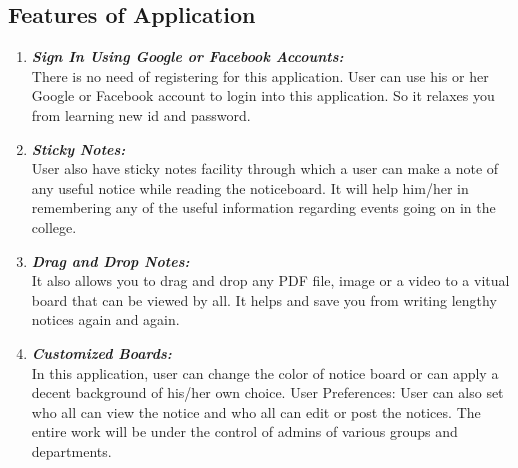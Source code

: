 \subsection{Features of Application}
\begin{enumerate}
\item \textbf{\emph{Sign In Using Google or Facebook Accounts:}}\\
 There is no need of registering for this
application. User can use his or her Google or Facebook account to login into this application. So
it relaxes you from learning new id and password.
\item \textbf{\emph{Sticky Notes:}}\\
User also have sticky notes facility through which a user can make a note of any
useful notice while reading the noticeboard. It will help him/her in remembering any of the
useful information regarding events going on in the college.
\item \textbf{\emph{Drag and Drop Notes:}}\\
It also allows you to drag and drop any PDF file, image or a video to
a vitual board that can be viewed by all. It helps and save you from writing lengthy notices again
and again.
\item \textbf{\emph{Customized Boards:}}\\
In this application, user can change the color of notice board or can
apply a decent background of his/her own choice.
User Preferences: User can also set who all can view the notice and who all can edit or post
the notices. The entire work will be under the control of admins of various groups and
departments.
\end{enumerate}
